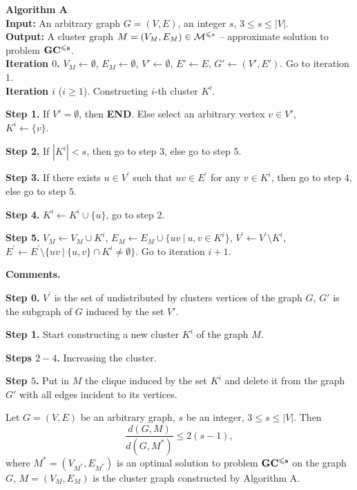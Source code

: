 \documentclass[runningheads]{llncs}
\begin{document}
\medskip

{\bf Algorithm A}
\\
\textbf{Input:} An arbitrary graph $G = (V,E)$, an integer $s$, 
$3 \leqslant s \leqslant |V|$.
\\
\textbf{Output:} A cluster graph $M = (V_M,E_M) \in {\cal M}^{\leqslant s}$ -- 
approximate solution to problem ${\bf GC^{\leqslant s}}$.
\\ 
\textbf{Iteration $0$.} $V_M \leftarrow \emptyset$, $E_M \leftarrow \emptyset$, 
$V' \leftarrow \emptyset$, $E' \leftarrow E$, $G' \leftarrow (V',E')$. 
Go to iteration $1$.
\\ 
\textbf{Iteration $i$} ($i \geqslant 1 $). Constructing $i$-th cluster $K^i$.
 
\textbf{Step 1.} If $V'=\emptyset$, then \textbf{END}.
Else 
select an arbitrary vertex  ${v \in V'}$,\\ $K^i \leftarrow \{v\}$.
 
\textbf{Step 2.} If $|K^i|<s$, then go to step $3$, else go to step $5$.
 
\textbf{Step 3.} If there exists $ u \in V^{'}$ such that $uv \in E^{'}$ for any $v \in K^i $, then go to step $4$, else go to step $5$. 
 
\textbf{Step 4.} $K^i \leftarrow K^i\cup \{u\}$, go to step 2.

\textbf{Step 5.} $V_M \leftarrow V_M \cup K^i$, 
$E_M \leftarrow E_M \cup \{uv \ | \ u,v \in K^i\}$, 
$V^{'} \leftarrow V^{'} \setminus K^i$, 
$E^{'} \leftarrow E^{'} \setminus  \{uv \ | \ \{u,v\} \cap K^i \neq \emptyset\}$.
Go to iteration $i+1$.

\medskip

\textbf{Comments.}

\textbf{Step 0.} $V^{'}$ is the set of undistributed by clusters 
vertices of the graph $G$, 
$G'$ is the subgraph of $G$ induced by the set $V'$.

\textbf{Step 1.} Start constructing a new cluster $K^i$ of the graph $M$.

\textbf{Steps $2-4$.} Increasing the cluster.

\textbf{Step $5$.} Put in $M$ the clique induced by the set $K^i$ 
and delete it from the graph $G'$ with all edges incident to its vertices.


\begin{theorem} \label{t4}
  Let $G=(V,E)$ be an arbitrary graph, $s$ be an integer, $3 \leqslant s \leqslant |V|$.
Then
  \begin{equation}\label{e2}
  \frac{d(G,M)}{d(G,M^*)} \leqslant 2(s - 1),
  \end{equation}
where $M^* = (V_{M^*},E_{M^*})$ is an optimal solution to problem 
${\bf GC^{\leqslant s}}$ 
on the graph $G$, $M = (V_M,E_M)$ is the cluster graph constructed 
by Algorithm A. 
\end{theorem}
\end{document}
